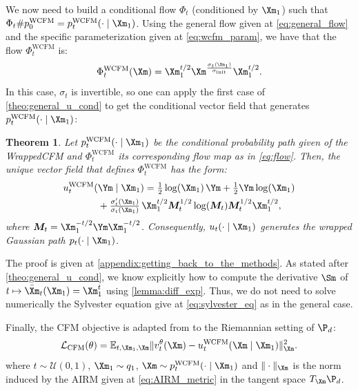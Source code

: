 \documentclass[10pt]{article} %
\theoremstyle{plain}
\newtheorem{theorem}{Theorem}[section]
\theoremstyle{definition}
\theoremstyle{remark}
\begin{document}
We now need to build a conditional flow $\Phi_t$ (conditioned by $\Xm_1$) such that $\Phi_t \# p^{\text{WCFM}}_0 = p^{\text{WCFM}}_t(\cdot \mid \Xm_1)$. Using the general flow given at \cref{eq:general_flow} and the specific parameterization given at \cref{eq:wcfm_param}, we have that the flow $\Phi^{\text{WCFM}}_t$ is:
\begin{equation}
  \Phi^{\text{WCFM}}_t(\Xm) = \Xm_1^{t/2}\Xm^{\frac{\sigma_t(\Xm_1)}{\sigma_{\text{init}}}}\Xm_1^{t/2}.
  \label{eq:flow}
\end{equation}
In this case, $\sigma_t$ is invertible, so one can apply the first case of \cref{theo:general_u_cond} to get the conditional vector field that generates $p^{\text{WCFM}}_t(\cdot \mid \Xm_1)$:
\begin{theorem}
  Let $p^{\text{WCFM}}_t(\cdot \mid \Xm_1)$ be the conditional probability path given of the WrappedCFM and $\Phi^{\text{WCFM}}_t$ its corresponding
  flow map as in \cref{eq:flow}. Then, the unique vector field that defines $\Phi^{\text{WCFM}}_t$ has the form:
  \begin{equation*}
    \begin{split}
      u^{\text{WCFM}}_t(&\Ym \mid \Xm_1)
      = \tfrac{1}{2}\log(\Xm_1)\,\Ym + \tfrac{1}{2}\Ym \log(\Xm_1)\\
      &+ \tfrac{\sigma'_t(\Xm_1)}{\sigma_t(\Xm_1)} \,\Xm_1^{t/2} \bm{M}_t^{1/2}\log(\bm{M}_t)\bm{M}_t^{1/2}\Xm_1^{t/2},
    \end{split}
  \end{equation*}
  where $\bm{M}_t = \Xm_1^{-t/2}\Ym \Xm_1^{-t/2}$. Consequently, $u_t(\cdot \mid \Xm_1)$ generates the wrapped Gaussian path $p_t(\cdot \mid \Xm_1)$.
  \label{eq:conditional_vector_field}
\end{theorem}
The proof is given at \cref{appendix:getting_back_to_the_methods}. As stated after \cref{theo:general_u_cond}, we know explicitly how to compute the derivative $\Sm$ of $t \mapsto \bar{\Xm}_t(\Xm_1) = \Xm_1^t$ using \cref{lemma:diff_exp}. Thus, we do not need to solve numerically the Sylvester equation give at \cref{eq:sylvester_eq} as in the general case.

Finally, the CFM objective is adapted from \citet{chen2024flow} to the Riemannian setting of $\P_d$:
\begin{equation}
  \mathcal{L}_{\text{CFM}}(\theta)
  = \mathbb{E}_{t, \Xm_1, \Xm}
  \|v_t^\theta(\Xm) - u^{\text{WCFM}}_t(\Xm \mid \Xm_1)\|_{\Xm}^2.
\end{equation}
where $t \sim \mathcal{U}(0,1)$, $\Xm_1 \sim q_1$, $\Xm \sim p^{\text{WCFM}}_t(\cdot \mid \Xm_1)$ and $\|\cdot \|_{\Xm}$ is the norm induced by the AIRM given at \cref{eq:AIRM_metric} in the tangent space $T_{\Xm} \P_d$.
\end{document}

